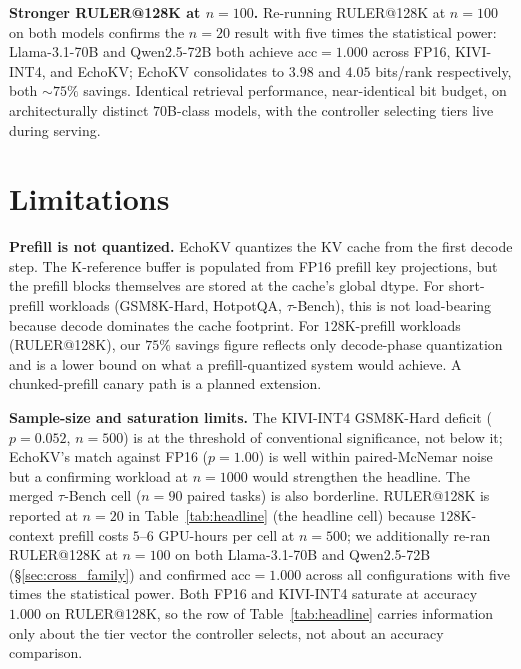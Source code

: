 \documentclass{article}
\begin{document}
\textbf{Stronger RULER@128K at $n{=}100$.} Re-running RULER@128K at
$n{=}100$ on both models confirms the $n{=}20$ result with five times
the statistical power: Llama-3.1-70B and Qwen2.5-72B both achieve
acc${=}1.000$ across FP16, KIVI-INT4, and EchoKV; EchoKV consolidates
to $3.98$ and $4.05$ bits/rank respectively, both $\sim$$75\%$ savings.
Identical retrieval performance, near-identical bit budget, on
architecturally distinct $70$B-class models, with the controller
selecting tiers live during serving.

\section{Limitations}
\label{sec:limitations}

\textbf{Prefill is not quantized.} EchoKV quantizes the KV cache from the
first decode step. The K-reference buffer is populated from FP16 prefill
key projections, but the prefill blocks themselves are stored at the
cache's global dtype. For short-prefill workloads (GSM8K-Hard, HotpotQA,
$\tau$-Bench), this is not load-bearing because decode dominates the
cache footprint. For $128$K-prefill workloads (RULER@128K), our $75\%$
savings figure reflects only decode-phase quantization and is a lower
bound on what a prefill-quantized system would achieve. A chunked-prefill
canary path is a planned extension.

\textbf{Sample-size and saturation limits.} The KIVI-INT4 GSM8K-Hard
deficit ($p{=}0.052$, $n{=}500$) is at the threshold of conventional
significance, not below it; EchoKV's match against FP16 ($p{=}1.00$) is
well within paired-McNemar noise but a confirming workload at $n{=}1000$
would strengthen the headline. The merged $\tau$-Bench cell ($n{=}90$
paired tasks) is also borderline. RULER@128K is reported at $n{=}20$ in
Table~\ref{tab:headline} (the headline cell) because $128$K-context
prefill costs $5$--$6$ GPU-hours per cell at $n{=}500$; we additionally
re-ran RULER@128K at $n{=}100$ on both Llama-3.1-70B and Qwen2.5-72B
(\S\ref{sec:cross_family}) and confirmed acc${=}1.000$ across all
configurations with five times the statistical power. Both FP16 and
KIVI-INT4 saturate at accuracy $1.000$ on RULER@128K, so the row of
Table~\ref{tab:headline} carries information only about the tier vector
the controller selects, not about an accuracy comparison.
\end{document}
